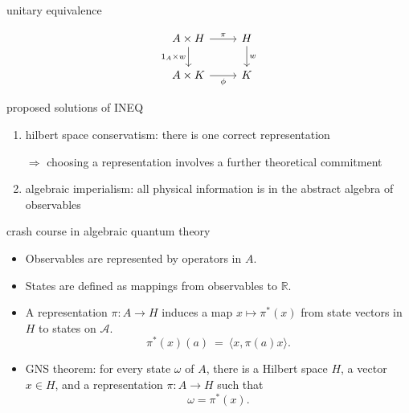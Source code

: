 \documentclass{beamer}
\begin{document}
\begin{frame}{unitary equivalence}

$$
\begin{tikzcd}[ampersand replacement=\&]
A \times H \arrow{r}{\pi } \arrow{d}[left]{1_A\times w } \& H \arrow{d}[right]{w} \\
A \times K \arrow{r}[below]{\phi } \& K 
\end{tikzcd}
$$

\end{frame}


\begin{frame}{proposed solutions of INEQ}

\begin{enumerate}
\item hilbert space conservatism: there is one correct representation

  {\small $\Longrightarrow$ choosing a representation involves a
    further theoretical commitment}

\bigskip

\item algebraic imperialism: all physical information is in the
  abstract algebra of observables

\end{enumerate}

\end{frame}

\begin{frame}{crash course in algebraic quantum theory}

\def\2{\mathcal}

\begin{itemize}
\item Observables are represented by operators in $A$.
\item States are defined as mappings from observables to $\mathbb{R}$.
\item A representation $\pi :A\to H$ induces a map $x\mapsto \pi
  ^*(x)$ from state vectors in $H$ to states on $\2A$.
$$ \pi ^*(x)(a) \: = \: \langle x,\pi (a)x \rangle .$$
\item GNS theorem: for every state $\omega$ of $A$, there is a Hilbert
  space $H$, a vector $x\in H$, and a representation $\pi :A\to H$
  such that 
$$\omega =\pi ^*(x) .$$
\end{itemize}


\end{frame}
\end{document}
